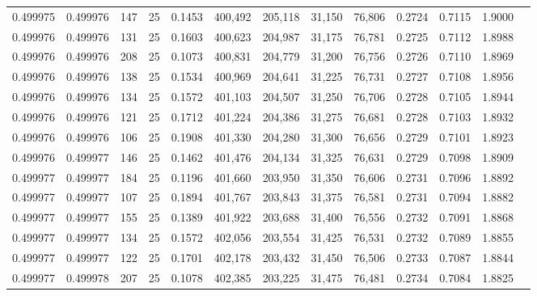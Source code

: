 \begin{tabular}{rrrrrrrrrrrrr}
0.499975 & 0.499976 &   147 &  25 &                                     0.1453 & 400,492 & 205,118 &  31,150 &  76,806 & 0.2724 & 0.7115 & 1.9000 \\
0.499976 & 0.499976 &   131 &  25 &                                     0.1603 & 400,623 & 204,987 &  31,175 &  76,781 & 0.2725 & 0.7112 & 1.8988 \\
0.499976 & 0.499976 &   208 &  25 &                                     0.1073 & 400,831 & 204,779 &  31,200 &  76,756 & 0.2726 & 0.7110 & 1.8969 \\
0.499976 & 0.499976 &   138 &  25 &                                     0.1534 & 400,969 & 204,641 &  31,225 &  76,731 & 0.2727 & 0.7108 & 1.8956 \\
0.499976 & 0.499976 &   134 &  25 &                                     0.1572 & 401,103 & 204,507 &  31,250 &  76,706 & 0.2728 & 0.7105 & 1.8944 \\
0.499976 & 0.499976 &   121 &  25 &                                     0.1712 & 401,224 & 204,386 &  31,275 &  76,681 & 0.2728 & 0.7103 & 1.8932 \\
0.499976 & 0.499976 &   106 &  25 &                                     0.1908 & 401,330 & 204,280 &  31,300 &  76,656 & 0.2729 & 0.7101 & 1.8923 \\
0.499976 & 0.499977 &   146 &  25 &                                     0.1462 & 401,476 & 204,134 &  31,325 &  76,631 & 0.2729 & 0.7098 & 1.8909 \\
0.499977 & 0.499977 &   184 &  25 &                                     0.1196 & 401,660 & 203,950 &  31,350 &  76,606 & 0.2731 & 0.7096 & 1.8892 \\
0.499977 & 0.499977 &   107 &  25 &                                     0.1894 & 401,767 & 203,843 &  31,375 &  76,581 & 0.2731 & 0.7094 & 1.8882 \\
0.499977 & 0.499977 &   155 &  25 &                                     0.1389 & 401,922 & 203,688 &  31,400 &  76,556 & 0.2732 & 0.7091 & 1.8868 \\
0.499977 & 0.499977 &   134 &  25 &                                     0.1572 & 402,056 & 203,554 &  31,425 &  76,531 & 0.2732 & 0.7089 & 1.8855 \\
0.499977 & 0.499977 &   122 &  25 &                                     0.1701 & 402,178 & 203,432 &  31,450 &  76,506 & 0.2733 & 0.7087 & 1.8844 \\
0.499977 & 0.499978 &   207 &  25 &                                     0.1078 & 402,385 & 203,225 &  31,475 &  76,481 & 0.2734 & 0.7084 & 1.8825 \\

\end{tabular}

